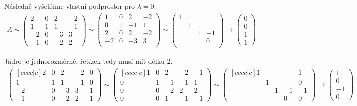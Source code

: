 \documentclass[]{article}
\begin{document}
\medskip
\medskip

Následně vyšetříme vlastní podprostor pro $\lambda=0$:
\begin{align*}
    A \sim
    \begin{pmatrix}
        2 & 0 & 2 & -2 \\
        1 & 1 & 1 & -1 \\
        -2 & 0 & -3 & 3 \\
        -1 & 0 & -2 & 2
    \end{pmatrix} \sim
    \begin{pmatrix}
        1 & 0 & 2 & -2 \\
        0 & 1 & -1 & 1 \\
        2 & 0 & 2 & -2 \\
        -2 & 0 & -3 & 3 \\
    \end{pmatrix} \sim
    \begin{pmatrix}
        1 & & & \\
        & 1 & & \\
        & & 1 & -1 \\
        & & & 0 \\
    \end{pmatrix}
    \rightarrow
    \begin{pmatrix}
        0 \\ 0 \\ 1 \\ 1
    \end{pmatrix}
\end{align*}

\medskip
\medskip

Jádro je jednorozměrné, řetízek tedy musí mít délku 2.
\begin{align*}
    \begin{pmatrix}[cccc|c]
        2 & 0 & 2 & -2 & 0\\
        1 & 1 & 1 & -1 & 0\\
        -2 & 0 & -3 & 3 & 1\\
        -1 & 0 & -2 & 2 & 1
    \end{pmatrix} \sim
    \begin{pmatrix}[cccc|c]
        1 & 0 & 2 & -2 & -1\\
        0 & 1 & -1 & -1 & 1\\
        0 & 0 & -2 & 2 & 2\\
        0 & 0 & 1 & -1 & -1
    \end{pmatrix} \sim
    \begin{pmatrix}[cccc|c]
        1 & & & & 1 \\
        & 1 & & & 0 \\
        & & 1 & -1 & -1 \\
        & & & 0 & 0
    \end{pmatrix}
    \rightarrow
    \begin{pmatrix}
        1 \\ 0 \\ -1 \\ 0
    \end{pmatrix}
\end{align*}
\end{document}
